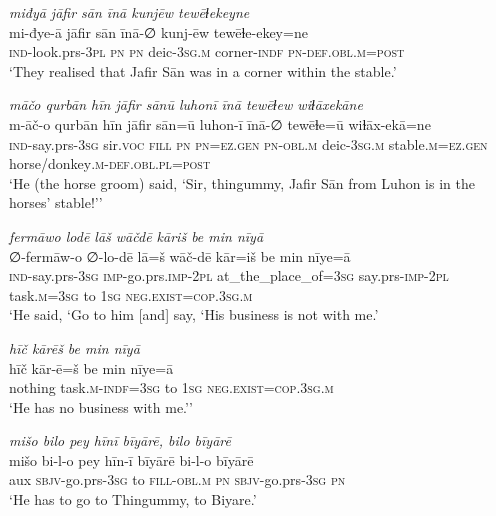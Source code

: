 \ea \label{ŠJ.67}
\textit{miđyā jāfir sān īnā kunjēw tewēɫekeyne} \\ 
\gll mi-đye-ā jāfir sān īnā-∅ kunj-ēw tewēɫe-ekey=ne \\ 
 \textsc{ind-}look.prs\textsc{-3pl} \textsc{pn} \textsc{pn} deic\textsc{-3sg}\textsc{.m} corner\textsc{-indf} \textsc{pn}\textsc{-def}\textsc{.obl}\textsc{.m}\textsc{=\textsc{post}} \\ 
\glt `They realised that Jafir Sān was in a corner within the stable.'
\z 
 
\ea \label{ŠJ.71}
\textit{māčo qurbān hīn jāfir sānū luhonī īnā tewēɫew wiɫāxekāne} \\ 
\gll m-āč-o qurbān hīn jāfir sān=ū luhon-ī īnā-∅ tewēɫe=ū wiɫāx-ekā=ne \\ 
 \textsc{ind-}say.prs\textsc{-3sg} sir.\textsc{voc} \textsc{fill} \textsc{pn} \textsc{pn}\textsc{=ez.gen} \textsc{pn}\textsc{-obl}\textsc{.m} deic\textsc{-3sg}\textsc{.m} stable\textsc{.m}\textsc{=ez.gen} horse/donkey\textsc{.m}\textsc{-def}\textsc{.obl}\textsc{.pl}\textsc{=\textsc{post}} \\ 
\glt `He (the horse groom) said, ‘Sir, thingummy, Jafir Sān from Luhon is in the horses’ stable!’'
\z 
 
\ea \label{ŠJ.74}
\textit{fermāwo lodē lāš wāčdē kāriš be min nīyā} \\ 
\gll ∅-fermāw-o ∅-lo-dē lā=š wāč-dē kār=iš be min nīye=ā \\ 
 \textsc{ind-}say.prs\textsc{-3sg} \textsc{imp-}go.prs.\textsc{imp-}\textsc{2pl} at\_the\_place\_of\textsc{=3sg} say.prs-\textsc{imp-}\textsc{2pl} task\textsc{.m}\textsc{=3sg} to \textsc{1sg} \textsc{\textsc{neg.}exist}\textsc{=cop}\textsc{.3sg}\textsc{.m} \\ 
\glt `He said, ‘Go to him [and] say, ‘His business is not with me.'
\z 
 
\ea \label{ŠJ.76}
\textit{hīč kārēš be min nīyā} \\ 
\gll hīč kār-ē=š be min nīye=ā \\ 
 nothing task\textsc{.m}\textsc{-indf}\textsc{=3sg} to \textsc{1sg} \textsc{\textsc{neg.}exist}\textsc{=cop}\textsc{.3sg}\textsc{.m} \\ 
\glt `He has no business with me.’'
\z 
 
\ea \label{ŠJ.78}
\textit{mišo bilo pey hīnī bīyārē, bilo bīyārē} \\ 
\gll mišo bi-l-o pey hīn-ī bīyārē bi-l-o bīyārē \\ 
 aux \textsc{sbjv-}go.prs\textsc{-3sg} to \textsc{fill}\textsc{-obl}\textsc{.m} \textsc{pn} \textsc{sbjv-}go.prs\textsc{-3sg} \textsc{pn} \\ 
\glt `He has to go to Thingummy, to Biyare.'
\z 
 
